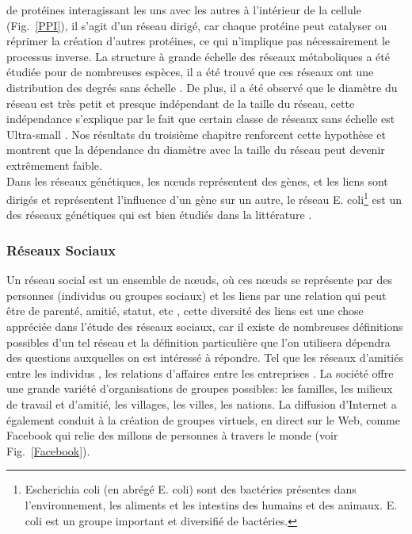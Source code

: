  de protéines interagissant les uns avec les autres à l'intérieur de la cellule (Fig.~\ref{PPI}), il s'agit d'un réseau
 dirigé, car chaque protéine peut catalyser ou réprimer la création d'autres protéines, ce qui n'implique pas 
 nécessairement le processus inverse. La structure à grande échelle des réseaux métaboliques a été étudiée pour
 de nombreuses espèces, il a été trouvé que ces réseaux ont une distribution des degrés sans échelle \cite{Je-al2000}.
 De plus, il a été observé que le diamètre du réseau est très petit et presque indépendant de la taille du réseau, 
 cette indépendance s'explique par le fait que certain classe de réseaux sans échelle est Ultra-small
 \cite{Cohen-Havlin2003,Do-al2003,ChL2003}. Nos résultats du troisième chapitre renforcent 
 cette hypothèse et montrent que la dépendance du diamètre avec la taille du réseau peut devenir extrêmement faible.\\
 Dans les réseaux génétiques, les nœuds représentent des gènes, et les liens sont dirigés  et représentent
 l'influence d'un gène sur un autre, le réseau E. coli\footnote{Escherichia coli (en abrégé E. coli) sont des
 bactéries présentes dans l'environnement, les aliments et les intestins des humains et des animaux. E. coli est 
 un groupe important et diversifié de bactéries.} est un des réseaux génétiques qui est bien étudiés dans la 
 littérature \cite{Mi-al2002}.


 \subsubsection{Réseaux Sociaux}
  Un réseau social est un ensemble de nœuds, où ces nœuds se représente par des  personnes  (individus ou groupes sociaux)
  et les liens par une relation qui peut être de parenté, amitié, statut, etc \cite{JS2000}, cette diversité des liens
  est une chose appréciée dans l'étude des réseaux sociaux, car il existe de nombreuses définitions possibles d'un tel 
  réseau et la définition particulière que l'on utilisera dépendra des questions auxquelles on est intéressé à répondre.
  Tel que les réseaux d'amitiés entre les individus \cite{WW1977,Mo1934}, les relations d'affaires entre les entreprises
  \cite{JP1977}.
  La société offre une grande variété d'organisations de groupes possibles: les familles, les milieux de travail et
  d'amitié, les villages, les villes, les nations. La diffusion d'Internet a également conduit à la création de
  groupes virtuels, en direct sur le Web, comme Facebook qui relie des millons de personnes à travers le monde
  (voir Fig.~\ref{Facebook}).
  

